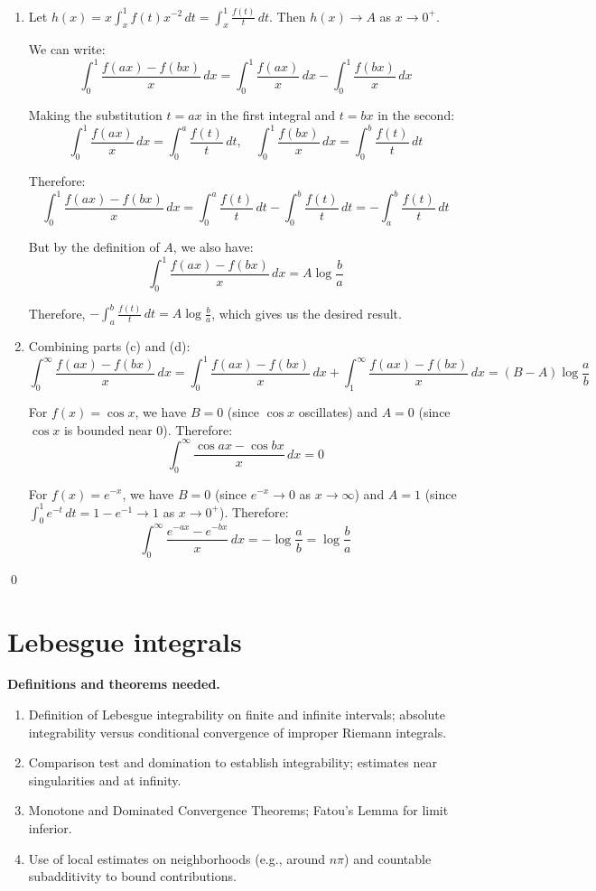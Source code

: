 \begin{enumerate}[label=(\alph*)]
    \item Let $h(x) = x \int_{x}^{1} f(t)x^{-2} \, dt = \int_{x}^{1} \frac{f(t)}{t} \, dt$. Then $h(x) \to A$ as $x \to 0^+$.
    
    We can write:
    \[\int_{0}^{1} \frac{f(ax) - f(bx)}{x} \, dx = \int_{0}^{1} \frac{f(ax)}{x} \, dx - \int_{0}^{1} \frac{f(bx)}{x} \, dx\]
    
    Making the substitution $t = ax$ in the first integral and $t = bx$ in the second:
    \[\int_{0}^{1} \frac{f(ax)}{x} \, dx = \int_{0}^{a} \frac{f(t)}{t} \, dt, \quad \int_{0}^{1} \frac{f(bx)}{x} \, dx = \int_{0}^{b} \frac{f(t)}{t} \, dt\]
    
    Therefore:
    \[\int_{0}^{1} \frac{f(ax) - f(bx)}{x} \, dx = \int_{0}^{a} \frac{f(t)}{t} \, dt - \int_{0}^{b} \frac{f(t)}{t} \, dt = -\int_{a}^{b} \frac{f(t)}{t} \, dt\]
    
    But by the definition of $A$, we also have:
    \[\int_{0}^{1} \frac{f(ax) - f(bx)}{x} \, dx = A \log \frac{b}{a}\]
    
    Therefore, $-\int_{a}^{b} \frac{f(t)}{t} \, dt = A \log \frac{b}{a}$, which gives us the desired result.
    
    \item Combining parts (c) and (d):
    \[\int_{0}^{\infty} \frac{f(ax) - f(bx)}{x} \, dx = \int_{0}^{1} \frac{f(ax) - f(bx)}{x} \, dx + \int_{1}^{\infty} \frac{f(ax) - f(bx)}{x} \, dx = (B - A) \log \frac{a}{b}\]
    
    For $f(x) = \cos x$, we have $B = 0$ (since $\cos x$ oscillates) and $A = 0$ (since $\cos x$ is bounded near 0). Therefore:
    \[\int_{0}^{\infty} \frac{\cos ax - \cos bx}{x} \, dx = 0\]
    
    For $f(x) = e^{-x}$, we have $B = 0$ (since $e^{-x} \to 0$ as $x \to \infty$) and $A = 1$ (since $\int_{0}^{1} e^{-t} \, dt = 1 - e^{-1} \to 1$ as $x \to 0^+$). Therefore:
    \[\int_{0}^{\infty} \frac{e^{-ax} - e^{-bx}}{x} \, dx = -\log \frac{a}{b} = \log \frac{b}{a}\]
\end{enumerate}\qed
\section{Lebesgue integrals}

\noindent\textbf{Definitions and theorems needed.}
\begin{enumerate}[label=(\alph*)]
    \item Definition of Lebesgue integrability on finite and infinite intervals; absolute integrability versus conditional convergence of improper Riemann integrals.
    \item Comparison test and domination to establish integrability; estimates near singularities and at infinity.
    \item Monotone and Dominated Convergence Theorems; Fatou's Lemma for limit inferior.
    \item Use of local estimates on neighborhoods (e.g., around $n\pi$) and countable subadditivity to bound contributions.
\end{enumerate}



